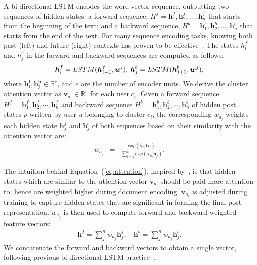 \documentclass{bmcart}
\begin{document}
A bi-directional LSTM encodes the word 
vector sequence, outputting two sequences of hidden states: a forward sequence,
$H^f={\boldsymbol{h}^f_1, \boldsymbol{h}^f_2,\ldots,
  \boldsymbol{h}^f_n}$ that starts from the beginning of the text; and
a backward sequence, $H^b={\boldsymbol{h}^b_1,
  \boldsymbol{h}^b_2,\ldots, \boldsymbol{h}^b_n}$ that starts from the
end of the text. For many sequence encoding tasks, knowing both past
(left) and future (right) contexts has proven to be effective~\cite{dyer2015transition}. The states $h^f_i$ and $h^b_j$ in
the forward and backward sequences are computed as follows:
\begin{eqnarray}
  \boldsymbol{h}^f_i=LSTM(\boldsymbol{h}^f_{i-1}, \boldsymbol{w}^i),
  \hspace{1mm}\boldsymbol{h}^b_j=LSTM(\boldsymbol{h}^b_{j+1}, \boldsymbol{w}^j), \nonumber 
\end{eqnarray}
where $\boldsymbol{h^f_i}, \boldsymbol{h^b_j}\in \mathbb{R}^e$, and
$e$ are the number of encoder units. We derive the cluster attention vector as
$\boldsymbol{v}_{a_i}\in\mathbb{R}^e$ for each user $c_i$. Given a forward sequence $H^f={\boldsymbol{h}^f_1, \boldsymbol{h}^f_2,\cdots,
  \boldsymbol{h}^f_n}$ and backward sequence $H^b={\boldsymbol{h}^b_1,
  \boldsymbol{h}^b_2,\cdots, \boldsymbol{h}^b_n}$ of hidden 
post states $p$ written by user $u$ belonging to cluster $c_i$, the
corresponding $w_{a_{j}}$ weights each hidden state $\boldsymbol{h}^f_j$ and
$\boldsymbol{h}^b_j$ of both sequences based on
their similarity with the attention vector are:
\begin{eqnarray}\label{eq:attention}
  w_{a_j}&=&\frac{exp(\boldsymbol{v}_{a_i}  \boldsymbol{h}_j)}{\sum^n_{l=1}exp(\boldsymbol{v}_{a_i} \boldsymbol{h}_j)}. 
\end{eqnarray}

The intuition behind Equation~(\ref{eq:attention}), inspired by~\cite{luong2015effective}, is that hidden states which are similar to
the attention vector $\boldsymbol{v}_{a_{i}}$ should be paid more
attention to; hence are weighted higher during document
encoding. $\boldsymbol{v}_{a_{i}}$ is adjusted during training to
capture hidden states that are significant in forming the final post
representation. $w_{a_j}$ is then used to compute forward and backward
weighted feature vectors:
\begin{eqnarray}
  \boldsymbol{h}^f=\sum^n_j w_{a_j} \boldsymbol{h}^f_j, 
  \quad\boldsymbol{h}^b=\sum^n_j w_{a_j} \boldsymbol{h}^b_j. 
\end{eqnarray}
We concatenate the forward and backward vectors to obtain a single
vector, following previous bi-directional LSTM practice~\cite{ma2016end}. \\
\end{document}
